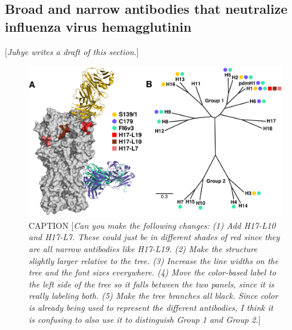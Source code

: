 \documentclass[11pt]{article}
\newcommand{\comment}[1]{{\color{red}[\textsl{#1}]}}
\begin{document}
\subsection*{Broad and narrow antibodies that neutralize influenza virus hemagglutinin}
\comment{Juhye writes a draft of this section.}
\begin{figure}
\centerline{\includegraphics[width=\textwidth]{figs/antibody_summary_fig/Ab_summary.pdf}}
\caption{\label{fig:antibody_summary}
CAPTION
\comment{Can you make the following changes:
(1) Add H17-L10 and H17-L7. These could just be in different shades of red since they are all narrow antibodies like H17-L19. (2) Make the structure slightly larger relative to the tree. (3) Increase the line widths on the tree and the font sizes everywhere. (4) Move the color-based label to the left side of the tree so it falls between the two panels, since it is really labeling both. (5) Make the tree branches all black. Since color is already being used to represent the different antibodies, I think it is confusing to also use it to distinguish Group 1 and Group 2.}}
\end{figure}
\end{document}
